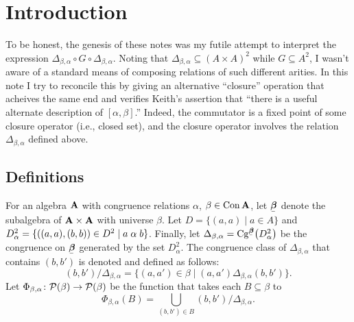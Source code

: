 \section{Introduction}
To be honest, the genesis of these notes was my futile attempt
to interpret the expression 
$\Delta_{\beta,\alpha}\circ G \circ \Delta_{\beta,\alpha}$.
Noting that 
$\Delta_{\beta,\alpha} \subseteq (A\times A)^2$ while
$G\subseteq A^2$, I wasn't aware of a standard means of composing 
relations of such different arities.
In this note I try to reconcile this by giving an alternative ``closure'' operation that 
acheives the same end and verifies Keith's assertion that ``there is a useful
alternate description of $[\alpha, \beta]$.''
Indeed, the commutator is a fixed point of some
closure operator (i.e., closed set), and the closure operator
involves the relation $\Delta_{\beta, \alpha}$ defined above.

\subsection{Definitions}
\label{sec:defs}
For an algebra $\mathbf{A}$ with congruence relations $\alpha$, $\beta\in \operatorname{Con}\mathbf{A}$,
let $\bbeta$ denote the subalgebra of $\mathbf{A}\times \mathbf{A}$ with universe 
$\beta$.
Let $D = \{(a,a) \mid a\in A\}$ and 
$D^2_\alpha = \{((a,a), (b,b)) \in D^2 \mid a\mathrel{\alpha} b\}$.
Finally, let
$\Delta_{\beta, \alpha} = \Cg^{\bbeta}\bigl(D^2_\alpha \bigr)$ be
the congruence on $\bbeta$ generated by the set $D^2_\alpha$.
The congruence class of $\Delta_{\beta, \alpha}$ that contains $(b,b')$ is
denoted and defined as follows:
\[
(b,b')/\Delta_{\beta,\alpha} = \{(a,a') \in \beta \mid (a,a') \mathrel{\Delta_{\beta,\alpha}} (b,b')\}.
\]
Let $\Phi_{\beta, \alpha} \colon \mathcal{P}(\beta) \to \mathcal{P}(\beta)$ be the function that
takes each $B \subseteq \beta$ to
\begin{equation}
  \label{eq:6}
  \Phi_{\beta, \alpha}(B) = \bigcup_{(b,b')\in B} (b,b')/\Delta_{\beta, \alpha}.
\end{equation}
\newcommand{\Phiba}{\ensuremath{\Phi}}
